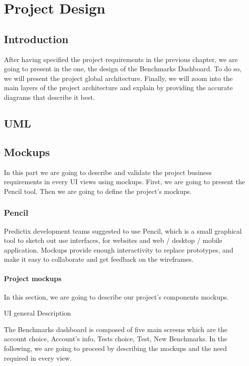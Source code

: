 \chapter{Project Design}

\section*{Introduction}
After having specified the project requirements in the  previous chapter, we are
going to present in the one,  the design of the Benchmarks Dashboard. To do so,
we will present the project global architecture. Finally, we will zoom into the
main layers of the project architecture and explain by providing the accurate
diagrams that describe it best.
\pagebreak

\section{UML}

\section{Mockups}
In this part we are going to describe and validate the project business
requirements in every UI views using mockups. First, we are going to present the
Pencil tool. Then we are going to define the project's mockups.

\subsection{Pencil}
Predictix development teams suggested to use Pencil, which is a small graphical
tool to sketch out use interfaces, for websites and web / desktop / mobile
application. Mockups provide enough interactivity to replace prototypes, and
make it easy to collaborate and get feedback on the wireframes.

\subsubsection{Project mockups}
In this section, we are going to describe our project's components mockups.

UI general Description

The Benchmarks dashboard is composed of five main screens which are the account
choice, Account's info, Tests choice, Test, New Benchmarks. In the following,
we are going to proceed by describing the mockups and the need required in every
view.

